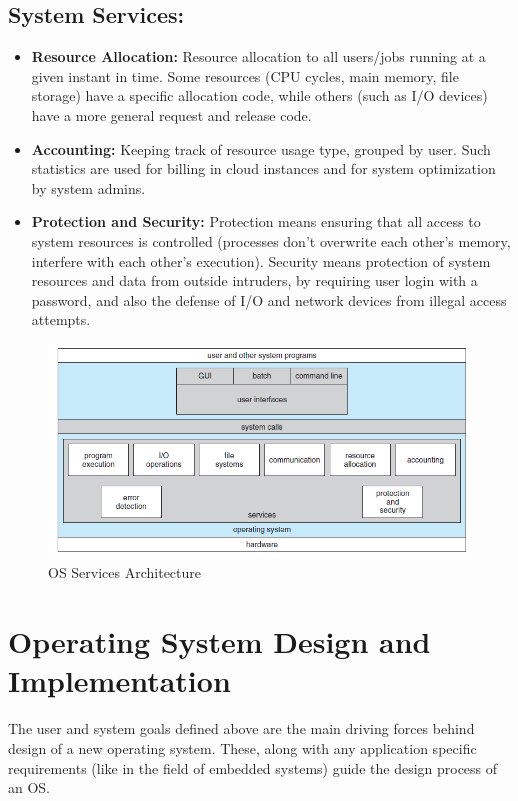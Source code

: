 \documentclass{article}
\theoremstyle{plain}
\theoremstyle{definition}
\begin{document}
\subsection{System Services:}
\begin{itemize}
    \item \textbf{Resource Allocation:} Resource allocation to all users/jobs running at a given instant in time. Some resources (CPU cycles, main memory, file storage) have a specific allocation code, while others (such as I/O devices) have a more general request and release code. 
    
    \item \textbf{Accounting:} Keeping track of resource usage type, grouped by user. Such statistics are used for billing in cloud instances and for system optimization by system admins.
    
    \item \textbf{Protection and Security:} Protection means ensuring that all access to system resources is controlled (processes don't overwrite each other's memory, interfere with each other's execution). Security means protection of system resources and data from outside intruders, by requiring user login with a password, and also the defense of I/O and network devices from illegal access attempts. 
\end{itemize}
\begin{figure}[h]
    \centering
    \includegraphics{os11.png}
    \caption{OS Services Architecture}
    \label{fig:my_label_11}
\end{figure}

\section{Operating System Design and Implementation}
The user and system goals defined above are the main driving forces behind design of a new operating system. These, along with any application specific requirements (like in the field of embedded systems) guide the design process of an OS.
\end{document}

